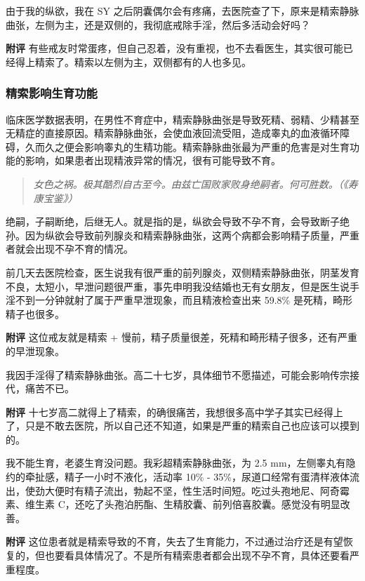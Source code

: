 \begin{case}[精索静脉曲张]
    由于我的纵欲，我在 SY 之后阴囊偶尔会有疼痛，去医院查了下，原来是精索静脉曲张，左侧为主，还是双侧的，我彻底戒除手淫，然后多活动会好吗？

    \textbf{附评} 有些戒友时常蛋疼，但自己忍着，没有重视，也不去看医生，其实很可能已经得上精索了。精索以左侧为主，双侧都有的人也多见。
\end{case}

\subsubsection{精索影响生育功能}

临床医学数据表明，在男性不育症中，精索静脉曲张是导致死精、弱精、少精甚至无精症的直接原因。精索静脉曲张，会使血液回流受阻，造成睾丸的血液循环障碍，久而久之便会影响睾丸的生精功能。精索静脉曲张最为严重的危害是对生育功能的影响，如果患者出现精液异常的情况，很有可能导致不育。

\begin{quote}\it
    女色之祸。极其酷烈自古至今。由兹亡国败家败身绝嗣者。何可胜数。（《寿康宝鉴》）
\end{quote}

绝嗣，子嗣断绝，后继无人。就是指的是，纵欲会导致不孕不育，会导致断子绝孙。因为纵欲会导致前列腺炎和精索静脉曲张，这两个病都会影响精子质量，严重者就会出现不孕不育的情况。

\begin{case}[精索静脉曲张]
    前几天去医院检查，医生说我有很严重的前列腺炎，双侧精索静脉曲张，阴茎发育不良，太短小，早泄问题很严重，事先申明我没结婚也无有女朋友，但是医生说手淫不到一分钟就射了属于严重早泄现象，而且精液检查出来 59.8\% 是死精，畸形精子也很多。

    \textbf{附评} 这位戒友就是精索 + 慢前，精子质量很差，死精和畸形精子很多，还有严重的早泄现象。
\end{case}

\begin{case}[精索静脉曲张]
    我因手淫得了精索静脉曲张。高二十七岁，具体细节不愿描述，可能会影响传宗接代，痛苦不已。

    \textbf{附评} 十七岁高二就得上了精索，的确很痛苦，我想很多高中学子其实已经得上了，只是不敢去医院，所以自己还不知道，如果是严重的精索自己也应该可以摸到的。
\end{case}

\begin{case}[精索静脉曲张]
    我不能生育，老婆生育没问题。我彩超精索静脉曲张，为 2.5 \unit{\mm}，左侧睾丸有隐约的牵扯感，精子一小时不液化，活动率 10\% - 35\%，尿道口经常有蛋清样液体流出，使劲大便时有精子流出，勃起不坚，性生活时间短。吃过头孢地尼、阿奇霉素、维生素 C，还吃了头孢泊肟酯、生精胶囊、前列倍喜胶囊。感觉没有明显改善。

    \textbf{附评} 这位患者就是精索导致的不育，失去了生育能力，不过通过治疗还是有望恢复的，但也要看具体情况了。不是所有精索患者都会出现不孕不育，具体还要看严重程度。
\end{case}

